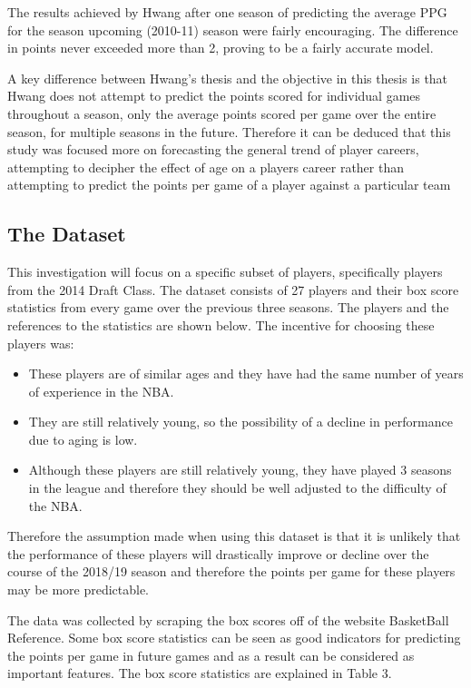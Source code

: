 \documentclass[a4paper,11pt,twoside]{article}
\begin{document}
The results achieved by Hwang after one season of predicting the average PPG for the season upcoming (2010-11) season were fairly encouraging. The difference in points never exceeded more than 2, proving to be a fairly accurate model.

A key difference between Hwang's thesis and the objective in this thesis is that Hwang does not attempt to predict the points scored for individual games throughout a season, only the average points scored per game over the entire season, for multiple seasons in the future. Therefore it can be deduced that this study was focused more on forecasting the general trend of player careers, attempting to decipher the effect of age on a players career rather than attempting to predict the points per game of a player against a particular team

\subsection{The Dataset}


This investigation will focus on a specific subset of players, specifically players from the 2014 Draft Class. The dataset consists of 27 players and their box score statistics from every game over the previous three seasons. The players and the references to the statistics are shown below. The incentive for choosing these players was:
\begin{itemize}
    \item These players are of similar ages and they have had the same number of years of experience in the NBA.
    \item They are still relatively young, so the possibility of a decline in performance due to aging is low.
    \item Although these players are still relatively young, they have played 3 seasons in the league and therefore they should be well adjusted to the difficulty of the NBA.
\end{itemize}
Therefore the assumption made when using this dataset is that it is unlikely that the performance of these players will drastically improve or decline over the course of the 2018/19 season and therefore the points per game for these players may be more predictable.

The data was collected by scraping the box scores off of the website BasketBall Reference. Some box score statistics can be seen as good indicators for predicting the points per game in future games and as a result can be considered as important features. The box score statistics are explained in Table 3.
\end{document}

